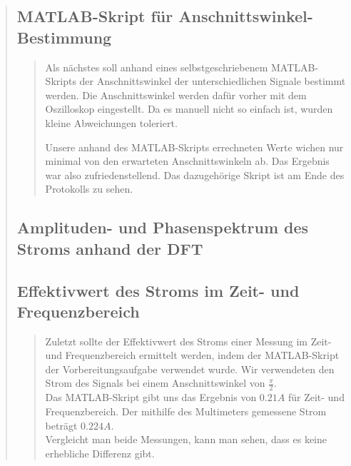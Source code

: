 \begin{quote}
\begin{quote}
	\cite{Schaltungwandlerbox}
	\end{quote}
	
	\subsection{MATLAB-Skript für Anschnittswinkel-Bestimmung}
	\begin{quote}	
	Als nächstes soll anhand eines selbstgeschriebenem MATLAB-Skripts der
	Anschnittswinkel der unterschiedlichen Signale bestimmt werden. Die
	Anschnittswinkel werden dafür vorher mit dem Oszilloskop eingestellt. Da es
	manuell nicht so einfach ist, wurden kleine Abweichungen toleriert.
	
	Unsere anhand des MATLAB-Skripts errechneten Werte wichen nur minimal von den
	erwarteten Anschnittswinkeln ab. Das Ergebnis war also zufriedenstellend. 
    Das dazugehörige Skript ist am Ende des Protokolls zu sehen.
   	\end{quote}
	
	\subsection{Amplituden- und Phasenspektrum des Stroms anhand der DFT}
	\begin{quote}
	\end{quote}
	
	\subsection{Effektivwert des Stroms im Zeit- und Frequenzbereich}
	\begin{quote}
	Zuletzt sollte der Effektivwert des Stroms einer Messung im Zeit- und
	Frequenzbereich ermittelt werden, indem der MATLAB-Skript der
	Vorbereitungsaufgabe verwendet wurde. Wir verwendeten den Strom des Signals bei
	einem Anschnittswinkel von $\frac{\pi}{2}$.\\
	Das MATLAB-Skript gibt uns das Ergebnis von $0.21 A$ für Zeit- und
	Frequenzbereich. Der mithilfe des Multimeters gemessene Strom beträgt $0.224
	A$.\\
	
	Vergleicht man beide Messungen, kann man sehen, dass es keine erhebliche
	Differenz gibt.
	
	 
	\end{quote}
\end{quote}

